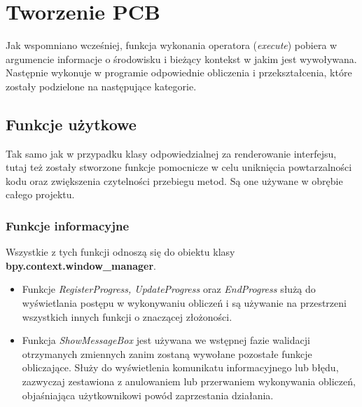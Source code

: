 \documentclass[brudnopis]{xmgr}
\begin{document}

\section {Tworzenie PCB}
Jak wspomniano wcześniej, funkcja wykonania operatora (\emph{execute}) pobiera w argumencie informacje o środowisku i bieżący kontekst w jakim jest wywoływana. Następnie wykonuje w programie odpowiednie obliczenia i przekształcenia, które zostały podzielone na następujące kategorie.
\subsection{Funkcje użytkowe}
Tak samo jak w przypadku klasy odpowiedzialnej za renderowanie interfejsu, tutaj też zostały stworzone funkcje pomocnicze w celu uniknięcia powtarzalności kodu oraz zwiększenia czytelności przebiegu metod. Są one używane w obrębie całego projektu.
\newpage
\subsubsection{Funkcje informacyjne}
Wszystkie z tych funkcji odnoszą się do obiektu klasy \textbf{bpy.context.window\_manager}.
\begin{itemize}
\item Funkcje \emph{RegisterProgress, UpdateProgress} oraz \emph{EndProgress} służą do wyświetlania postępu w wykonywaniu obliczeń i są używanie na przestrzeni wszystkich innych funkcji o znaczącej złożoności. 
\item Funkcja \emph{ShowMessageBox} jest używana we wstępnej fazie walidacji otrzymanych zmiennych zanim zostaną wywołane pozostałe funkcje obliczające. Służy do wyświetlenia komunikatu informacyjnego lub błędu, zazwyczaj zestawiona z anulowaniem lub przerwaniem wykonywania obliczeń, objaśniająca użytkownikowi powód zaprzestania działania.
\end{itemize}
\end{document}
